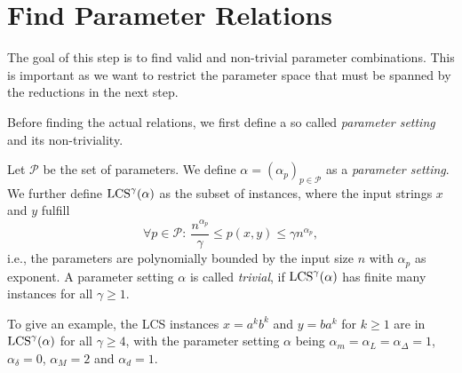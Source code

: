 \section{Find Parameter Relations}
\label{sec:fin_param_rels}
The goal of this step is to find valid and non-trivial parameter combinations.
This is important as we want to restrict the parameter space that must be spanned by the reductions in the next step.

Before finding the actual relations, we first define a so called \emph{parameter setting} and its non-triviality.

\begin{definition}
Let $\mathcal{P}$ be the set of parameters.
We define $\mathbb{\alpha} = (\alpha_p)_{p \in \mathcal{P}}$ as a \emph{parameter setting}.
We further define $\text{LCS}^\gamma(\mathbb{\alpha})$ as the subset of \lcs{} instances, where the input strings $x$ and $y$ fulfill
\begin{displaymath}
	\forall p \in \mathcal{P}: \  \frac{n^{\alpha_p}}{\gamma} \leq p(x,y) \leq \gamma n^{\alpha_p},
\end{displaymath}
i.e., the parameters are polynomially bounded by the input size $n$ with $\alpha_p$ as exponent.
A parameter setting $\mathbb{\alpha}$ is called \emph{trivial}, if $\text{LCS}^\gamma(\alpha)$ has finite many instances for all $\gamma \geq 1$.
\end{definition}
%
To give an example, the LCS instances $x=a^{k}b^{k}$ and $y = ba^k$ for $k\geq 1$ are in $\text{LCS}^\gamma(\mathbb{\alpha})$ for all $\gamma \geq 4$, with the parameter setting $\mathbb{\alpha}$ being $\alpha_m = \alpha_L = \alpha_\Delta = 1$, $\alpha_\delta = 0$, $\alpha_M = 2$ and $\alpha_d = 1$.


